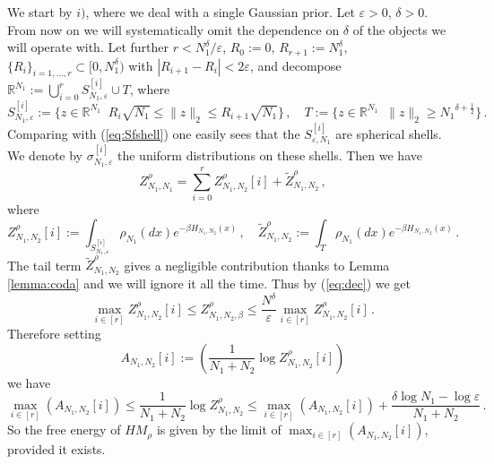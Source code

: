 \documentclass[10pt,oneside,a4paper,reqno]{amsart}  %
\def\be{\begin{equation}}
\def\ee{\end{equation}}
\def\e{\varepsilon}
\def\d{\delta}
\def\b{\beta}
\def\r{\rho}
\def\s{\sigma}
\def\R{\mathbb{R}}
\theoremstyle{plain}
\numberwithin{equation}{section}
\begin{document}
We start by $i)$, where we deal with a single Gaussian prior. 
Let $\e>0$, $\d>0$. From now on we will systematically omit the dependence on $\d$ of the objects we will operate with. Let further $r<N_1^{\d}/\e$, $R_0:=0$, $R_{r+1}:=N_1^{\d}$, $\{R_i\}_{i=1,\ldots,r}\subset[0,N_1^{\d})$ with $|R_{i+1}-R_i|<2\e$, and decompose
$
\R^{N_1}:=\bigcup_{i=0}^rS^{[i]}_{N_1,\e}\cup T
$, where 
$$
S^{[i]}_{N_1,\e}:=\{z\in\R^{N_1}\,\:\, R_i\sqrt{N_1}\leq \|z\|_2\leq R_{i+1}\sqrt{N_1}\}\,,\quad T:=\{z\in\R^{N_1}\,\:\, \|z\|_2\geq {N_1}^{\d+\frac12}\}\,.
$$
Comparing with (\ref{eq:Sfshell}) one easily sees that the $S^{[i]}_{\e,N_1}$ are spherical shells. We denote by $\s^{[i]}_{N_1,\e}$ the uniform distributions on  these shells. 
Then we have
\be\label{eq:dec}
Z^{\r}_{N_1,N_1}=\sum_{i=0}^r Z^{\r}_{N_1,N_2}[i]+\tilde Z^{\r}_{N_1,N_2}\,,
\ee
where
$$
Z^{\r}_{N_1,N_2}[i]:=\int_{S^{[i]}_{N_1,\e}}\r_{N_1}(dx)e^{-\b H_{N_1,N_2}(x)}\,,\quad \tilde Z^{\r}_{N_1,N_2}:=\int_{T}\r_{N_1}(dx)e^{-\b H_{N_1,N_2}(x)}\,.
$$
The tail term $\tilde Z^\r_{N_1,N_2}$ gives a negligible contribution thanks to Lemma \ref{lemma:coda} and we will ignore it all the time.
Thus by (\ref{eq:dec}) we get 
$$
\max_{i\in[r]} Z^{\r}_{N_1,N_2}[i]\leq Z^{\r}_{N_1,N_2,\b}\leq \frac{N^{\d}}{\e}\max_{i\in[r]} Z^{\r}_{N_1,N_2}[i]\,.
$$
Therefore setting
\be\label{eq:def-tildeA}
A_{N_1,N_2}[i]:=\left(\frac{1}{N_1+N_2}\log Z^{\r}_{N_1,N_2}[i]\right)
\ee
we have
\be\label{eq:sandwich}
\max_{i\in[r]}\left(A_{N_1,N_2}[i]\right)\leq \frac{1}{N_1+N_2}\log Z^{\r}_{N_1,N_2}\leq \max_{i\in[r]}\left(A_{N_1,N_2}[i]\right)+\frac{\d\log N_1-\log \e}{N_1+N_2}\,. 
\ee
So the free energy of $HM_{\r}$ is given by the limit of $\max_{i\in[r]}\left(A_{N_1,N_2}[i]\right)$, provided it exists. 
\end{document}
